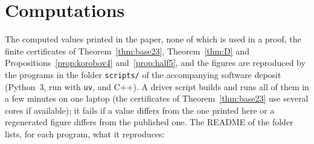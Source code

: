 \documentclass[11pt]{amsart}
\theoremstyle{definition}
\theoremstyle{plain}
\begin{document}
\section{Computations}\label{app:verify}
The computed values printed in the paper, none of which is used in a proof, the finite certificates of Theorem~\ref{thm:base23}, Theorem~\ref{thm:D} and Propositions~\ref{prop:korobov4} and~\ref{prop:half5}, and the figures are reproduced by the programs in the folder \texttt{scripts/} of the accompanying software deposit (Python~3, run with \texttt{uv}, and C++). A driver script builds and runs all of them in a few minutes on one laptop (the certificates of Theorem~\ref{thm:base23} use several cores if available); it fails if a value differs from the one printed here or a regenerated figure differs from the published one. The README of the folder lists, for each program, what it reproduces:
\end{document}
